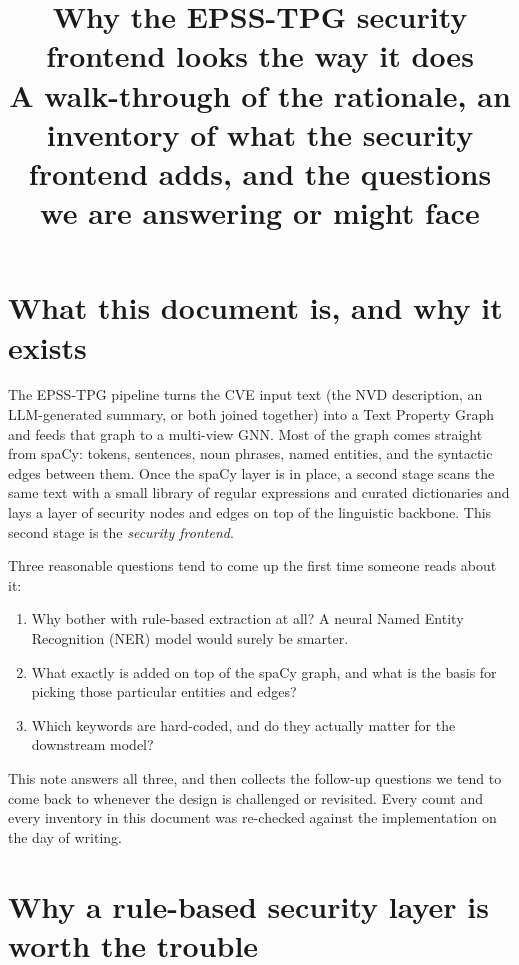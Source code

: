 \documentclass[11pt,a4paper]{article}
\title{\color{accent}\bfseries
       Why the EPSS-TPG security frontend looks the way it does\\[2pt]
       \large A walk-through of the rationale, an inventory of
       what the security frontend adds, and the
       questions we are answering or might face}
\author{}
\date{}
\begin{document}
\maketitle
\thispagestyle{empty}

\section*{What this document is, and why it exists}

The EPSS-TPG pipeline turns the CVE input text (the NVD
description, an LLM-generated summary, or both joined
together) into a Text Property Graph and feeds that graph
to a multi-view GNN. Most of the graph comes straight from
spaCy: tokens, sentences, noun phrases, named entities,
and the syntactic edges between them. Once the spaCy layer
is in place, a second stage scans the same text with a
small library of regular expressions and curated
dictionaries and lays a layer of security nodes and edges
on top of the linguistic backbone. This second stage is
the \emph{security frontend}.

Three reasonable questions tend to come up the first time
someone reads about it:

\begin{enumerate}[leftmargin=*, itemsep=0pt]
    \item Why bother with rule-based extraction at all?
          A neural Named Entity Recognition (NER) model
          would surely be smarter.
    \item What exactly is added on top of the spaCy graph,
          and what is the basis for picking those particular
          entities and edges?
    \item Which keywords are hard-coded, and do they
          actually matter for the downstream model?
\end{enumerate}

This note answers all three, and then collects the
follow-up questions we tend to come back to whenever the
design is challenged or revisited. Every count and every
inventory in this document was re-checked against the
implementation on the day of writing.

\section{Why a rule-based security layer is worth the trouble}
\label{sec:why-bother}
\end{document}
